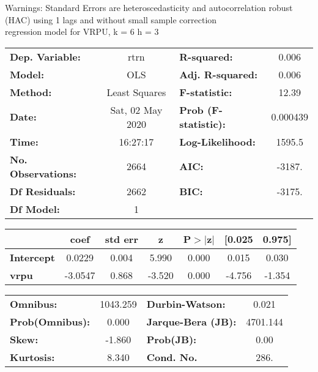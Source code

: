 Warnings: \newline
 [1] Standard Errors are heteroscedasticity and autocorrelation robust (HAC) using 1 lags and without small sample correction\\ 

regression model for VRPU, k = 6 h = 3\begin{center}
\begin{tabular}{lclc}
\toprule
\textbf{Dep. Variable:}    &       rtrn       & \textbf{  R-squared:         } &     0.006   \\
\textbf{Model:}            &       OLS        & \textbf{  Adj. R-squared:    } &     0.006   \\
\textbf{Method:}           &  Least Squares   & \textbf{  F-statistic:       } &     12.39   \\
\textbf{Date:}             & Sat, 02 May 2020 & \textbf{  Prob (F-statistic):} &  0.000439   \\
\textbf{Time:}             &     16:27:17     & \textbf{  Log-Likelihood:    } &    1595.5   \\
\textbf{No. Observations:} &        2664      & \textbf{  AIC:               } &    -3187.   \\
\textbf{Df Residuals:}     &        2662      & \textbf{  BIC:               } &    -3175.   \\
\textbf{Df Model:}         &           1      & \textbf{                     } &             \\
\bottomrule
\end{tabular}
\begin{tabular}{lcccccc}
                   & \textbf{coef} & \textbf{std err} & \textbf{z} & \textbf{P$> |$z$|$} & \textbf{[0.025} & \textbf{0.975]}  \\
\midrule
\textbf{Intercept} &       0.0229  &        0.004     &     5.990  &         0.000        &        0.015    &        0.030     \\
\textbf{vrpu}      &      -3.0547  &        0.868     &    -3.520  &         0.000        &       -4.756    &       -1.354     \\
\bottomrule
\end{tabular}
\begin{tabular}{lclc}
\textbf{Omnibus:}       & 1043.259 & \textbf{  Durbin-Watson:     } &    0.021  \\
\textbf{Prob(Omnibus):} &   0.000  & \textbf{  Jarque-Bera (JB):  } & 4701.144  \\
\textbf{Skew:}          &  -1.860  & \textbf{  Prob(JB):          } &     0.00  \\
\textbf{Kurtosis:}      &   8.340  & \textbf{  Cond. No.          } &     286.  \\
\bottomrule
\end{tabular}
\end{center}

